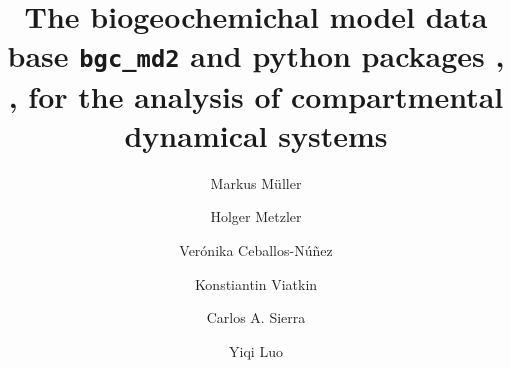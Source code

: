 
%
%

\title{The biogeochemichal model data base \texttt{bgc\_md2} and python
packages  \LAPM, \CompartmentalSystems, \ComputabilityGraphs for the analysis of compartmental dynamical systems}
%
%






\author[2]{M{arkus M{\"{u}}ller}}
\author[4]{Holger Metzler}
\author[3]{Ver{\'{o}}nika Ceballos-N{\'{u}}{\~{n}}ez}
\author[2]{Konstiantin Viatkin}
\author[1]{Carlos A. Sierra}
\author[2]{Yiqi Luo}
\affil[3]{}
\affil[4]{}

\begin{abstract} \noindent
  
\end{abstract}

